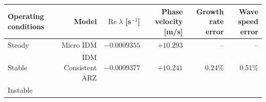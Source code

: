 \documentclass[11pt,a4paper,openany]{book}
\numberwithin{equation}{chapter}
\numberwithin{figure}{chapter}
\numberwithin{table}{chapter}
\begin{document}
\begin{center}
\small
{}
\label{tab:micro-macro-dynamic-errors}
\begin{tabular}{lrrrrr}
\toprule







Operating conditions




&




 Model




& $\operatorname{Re}\lambda$ [s$^{-1}$] &




 Phase velocity [m/s]




&




 Growth rate error




&




 Wave speed error



\\
\midrule







Steady




&




 Micro IDM




& $-0.0009355$ & $+10.293$ & -- & -- \\







Stable




&




 IDM Consistent ARZ




& $-0.0009377$ & $+10.241$ & $0.24\%$ & $0.51\%$ \\
\midrule







Instable





\end{tabular}
\end{center}
\end{document}
